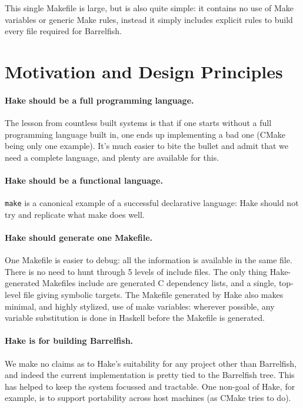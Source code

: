 \documentclass[a4paper,twoside]{report} %
\begin{document}
This single Makefile is large, but is also quite simple: it contains
no use of Make variables or generic Make rules, instead it simply
includes explicit rules to build every file required for Barrelfish. 

\section{Motivation and Design Principles}

\paragraph{Hake should be a full programming language.}  The lesson
from countless built systems is that if one starts without a full
programming language built in, one ends up implementing a bad one
(CMake being only one example).  It's much easier to bite the bullet
and admit that we need a complete language, and plenty are available
for this. 

\paragraph{Hake should be a functional language.}  \texttt{make} is a
canonical example of a successful declarative language: Hake should
not try and replicate what make does well.  

\paragraph{Hake should generate one Makefile.} One Makefile is easier
to debug: all the information is available in the same file.  There is
no need to hunt through 5 levels of include files.  The only thing
Hake-generated Makefiles include are generated C dependency lists, and
a single, top-level file giving symbolic targets.  The Makefile
generated by Hake also makes minimal, and highly stylized, use of make
variables: wherever possible, any variable substitution is done in Haskell
before the Makefile is generated. 

\paragraph{Hake is for building Barrelfish.}  We make no claims as to
Hake's suitability for any project other than Barrelfish, and indeed
the current implementation is pretty tied to the Barrelfish tree.
This has helped to keep the system focussed and tractable.  One
non-goal of Hake, for example, is to support portability across host
machines (as CMake tries to do). 
\end{document}
